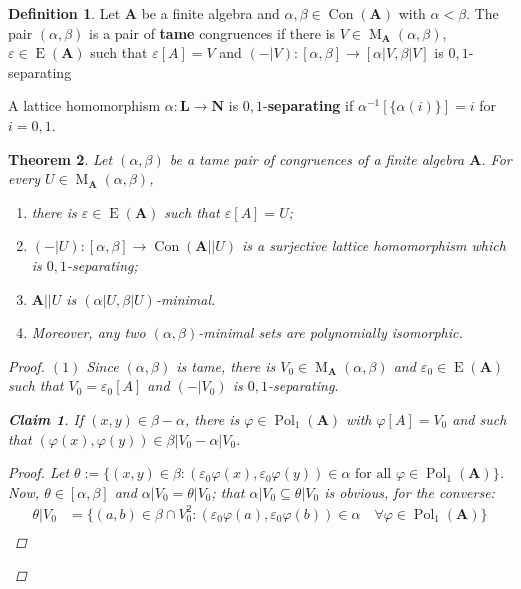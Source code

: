 \documentclass{amsart}
\theoremstyle{plain}
\newtheorem{theorem}{Theorem}[section]
\newtheorem{claim}{Claim}
\theoremstyle{definition}
\newtheorem{definition}[theorem]{Definition}
\theoremstyle{remark}
\def\phi{\varphi}
\def\epsilon{\varepsilon}
\def\A{\forall}
\DeclareMathOperator{\Con}{Con}
\DeclareMathOperator{\Pol}{Pol}
\DeclareMathOperator{\Id}{E}
\DeclareMathOperator{\M}{M}
\begin{document}
\begin{definition}
    Let $\mathbf{A}$ be a finite algebra and $\alpha, \beta \in \Con(\mathbf{A})$ with $\alpha < \beta$. 
    The pair $(\alpha, \beta)$ is a pair of \textbf{tame} congruences if there is $V \in \M_{\mathbf{A}}(\alpha, \beta)$, $\epsilon \in \Id(\mathbf{A})$ such that $\epsilon[A]=V$ and 
    $(-|V): [\alpha, \beta] \to [\alpha|V, \beta|V]$ is $0,1$-separating
    
    A lattice homomorphism $\alpha: \mathbf{L} \to \mathbf{N}$ is $0,1$-\textbf{separating} if $\alpha^{-1}[\{\alpha(i)\}]=i$ for $i=0,1$. 
\end{definition}

\begin{theorem}
    Let $(\alpha, \beta)$ be a tame pair of congruences of a finite algebra $\mathbf{A}$.
    For every $U \in \M_{\mathbf{A}}(\alpha, \beta)$, 
    \begin{enumerate} 
        \item there  is $\epsilon \in \Id(\mathbf{A})$ such that $\epsilon[A]=U$; 
        \item $(-|U): [\alpha, \beta] \to \Con(\mathbf{A}||U)$ is a surjective lattice homomorphism which is $0,1$-separating;
        \item $\mathbf{A}||U$ is $(\alpha|U, \beta|U)$-minimal. 
        \item Moreover, any two $(\alpha, \beta)$-minimal sets are polynomially isomorphic. 
    \end{enumerate}
    \begin{proof}
        $(1)$ Since $(\alpha, \beta)$ is tame, there is $V_0 \in \M_\mathbf{A}(\alpha,\beta)$ and $\epsilon_0 \in \Id(\mathbf{A})$ such that $V_0 = \epsilon_0[A]$ and $(-|V_0)$ is $0,1$-separating. 
        \begin{claim}
            \label{lemma_pol_claim1}
            If $(x,y) \in \beta - \alpha$, there is $\phi \in \Pol_1(\mathbf{A})$ with $\phi[A]=V_0$ and such that $(\phi(x), \phi(y)) \in \beta|V_0 - \alpha|V_0$. 
            \begin{proof}
                Let $\theta:=\{(x,y) \in \beta : (\epsilon_0 \phi (x), \epsilon_0 \phi(y)) \in \alpha \text{ for all } \phi \in \Pol_1(\mathbf{A})\}$. 
                Now, $\theta \in [\alpha, \beta]$ and $\alpha |V_0 = \theta|V_0$; 
                that $\alpha |V_0 \subseteq \theta|V_0$ is obvious, for the converse: 
                \begin{align*}
                    \theta|V_0 & = \{ (a,b) \in \beta \cap V^2_0: (\epsilon_0 \phi (a), \epsilon_0 \phi(b)) \in \alpha \quad \A \phi \in \Pol_1(\mathbf{A})\}  \\

\end{align*}
\end{proof}
\end{claim}
\end{proof}
\end{theorem}
\end{document}
